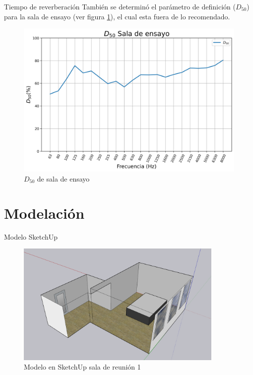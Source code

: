 \documentclass{sintefbeamer}
\begin{document}
\begin{frame}{Tiempo de reverberación}
    También se determinó el parámetro de definición ($D_{50}$) para la sala de ensayo (ver figura \ref{fig: D50 sala de ensayo}), el cual esta fuera de lo recomendado.
    \begin{figure}[H]
        \centering
        \includegraphics[scale=0.35]{images/D50_ensayo.png}
        \caption{$D_{50}$ de sala de ensayo}
        \label{fig: D50 sala de ensayo}
    \end{figure}
\end{frame}
\section{Modelación}
\begin{frame}{Modelo SketchUp}
    \begin{figure}
        \centering
        \includegraphics[width=10cm]{images/Sketchup/Sala 1 Sketchup.png}
        \caption{Modelo en SketchUp sala de reunión 1}
        \label{fig:skp sala 1}
    \end{figure}
\end{frame}
\end{document}
